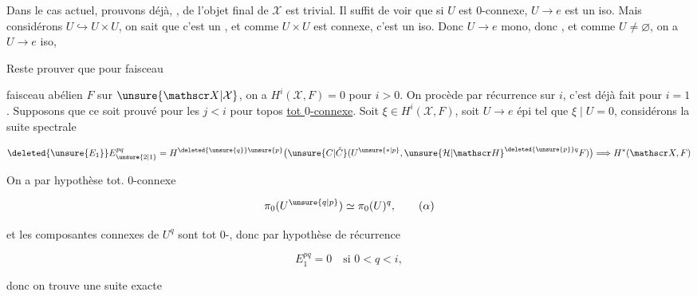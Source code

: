 Dans le cas actuel, prouvons déjà,  ,    de  l'objet final de $\mathscr X$ est trivial. Il suffit de voir que si $U$ est $0$-connexe,  $U\longrightarrow e$ est un iso.  Mais considérons $U\hookrightarrow U\times U$, on sait que c'est un  , et comme $U\times U$ est connexe, c'est un iso. Donc $U\longrightarrow e$ mono,  donc  , et comme $U\ne\varnothing$, on a $U\longrightarrow e$ iso,

Reste  prouver que pour  faisceau


faisceau abélien  $F$ sur $\unsure{\mathscr X|\mathcal X}$, on a $H^i(\mathscr X,F)=0$ pour $i>0$. On procède par récurrence sur $i$, c'est déjà fait pour $i=1$.  Supposons que ce soit prouvé pour les $j<i$   pour  topos  \uline{tot $0$-connexe}. Soit $\xi\in H^i(\mathscr X,F)$, soit $U\to e$ épi tel que $\xi\mid U=0$,  considérons la suite spectrale

\[
\deleted{\unsure{E_1}}E_{\unsure{2|1}}^{pq}=H^{\deleted{\unsure{q}}\unsure{p}}\bigl(\unsure{C|\check C}(U^{\unsure{*|p}},\unsure{\mathcal H|\mathscr H}^{\deleted{\unsure{p}}q}F)\bigr)\Longrightarrow H^*(\mathscr X,F)
\]

 On a par hypothèse tot. $0$-connexe

\[
\pi_0(U^{\unsure{q|p}})\simeq\pi_0(U)^q,\tag*{$(\alpha)$}
\]

et les composantes connexes de $U^q$ sont  tot $0$-, donc par hypothèse de récurrence

\[
E_1^{pq}=0\quad\text{si }0<q<i,
\]

donc on trouve une suite exacte


